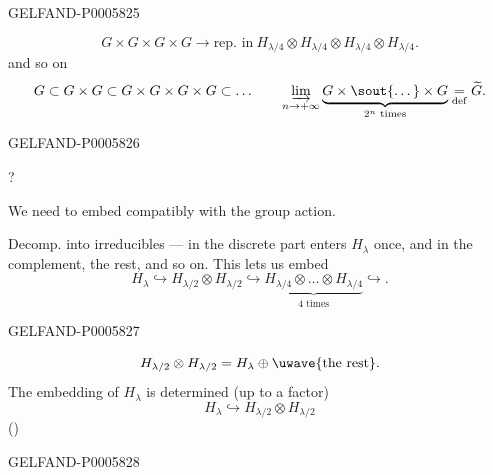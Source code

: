 \begin{GelfandAdjacentEvidence}{GELFAND-P000582}{5}

\[
G\times G\times G\times G\longrightarrow
\text{rep. in}\ 
H_{\lambda/4}\otimes H_{\lambda/4}\otimes H_{\lambda/4}\otimes H_{\lambda/4}.
\]
and so on
\[
G\subset G\times G\subset G\times G\times G\times G\subset\ldots
\qquad
\underset{n\to+\infty}{\varinjlim}
\underbrace{G\times\text{\sout{\textellipsis{}}}\times G}_{2^n\text{ times}}
\underset{\mathrm{def}}{=}\widetilde G.
\]
\end{GelfandAdjacentEvidence}
\begin{GelfandAdjacentEvidence}{GELFAND-P000582}{6}


?

We need to embed  compatibly with the group action.

Decomp. into irreducibles — in the discrete part enters \(H_\lambda\) once, and in the complement, the rest, and so on. This lets us embed
\[
H_\lambda\hookrightarrow H_{\lambda/2}\otimes H_{\lambda/2}
\hookrightarrow
\underbrace{H_{\lambda/4}\otimes\ldots\otimes H_{\lambda/4}}_{4\text{ times}}
\hookrightarrow.
\]
\end{GelfandAdjacentEvidence}
\begin{GelfandAdjacentEvidence}{GELFAND-P000582}{7}

\[
H_{\lambda/2}\otimes H_{\lambda/2}=H_\lambda\oplus\text{\uwave{the rest}}.
\]
The embedding of \(H_\lambda\) is determined (up to a factor)
\[
H_\lambda\hookrightarrow H_{\lambda/2}\otimes H_{\lambda/2}
\]
\noindent\hfill
{}\qquad
(\uwave{unit. embedding})\par
{}
\end{GelfandAdjacentEvidence}
\begin{GelfandAdjacentEvidence}{GELFAND-P000582}{8}

\end{GelfandAdjacentEvidence}
